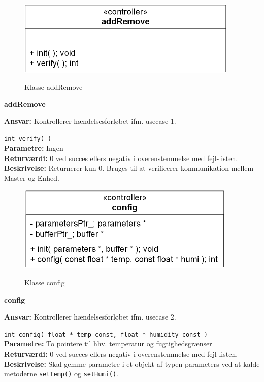 
\begin{figure}[htbp] \centering
{\includegraphics[scale=1.3]{filer/design/Klassediagrammer/sw_psoc_addRemove}}
\caption{Klasse addRemove}
\label{fig:sw_psoc_class_addremove}
\end{figure} 

{\centering
\textbf{addRemove}\par
}
\textbf{Ansvar:} Kontrollerer hændelsesforløbet ifm. usecase 1. \

\verb+int verify( )+\\
\textbf{Parametre:} Ingen \\
\textbf{Returværdi:} 0 ved succes ellers negativ i overenstemmelse med fejl-listen. \\
\textbf{Beskrivelse:} Returnerer kun 0. Bruges til at verificerer kommunikation mellem Master og Enhed.\\

\begin{figure}[htbp] \centering
{\includegraphics[scale=1.3]{filer/design/Klassediagrammer/sw_psoc_config}}
\caption{Klasse config}
\label{fig:sw_psoc_class_config}
\end{figure} 

{\centering
\textbf{config}\par
}
\textbf{Ansvar:} Kontrollerer hændelsesforløbet ifm. usecase 2. \

\verb+int config( float * temp const, float * humidity const )+ \\
\textbf{Parametre:} To pointere til hhv. temperatur og fugtighedsgrænser \\
\textbf{Returværdi:} 0 ved succes ellers negativ i overenstemmelse med fejl-listen. \\
\textbf{Beskrivelse:} Skal gemme parametre i et objekt af typen parameters ved at kalde metoderne \verb+setTemp()+ og \verb+setHumi()+.\\

